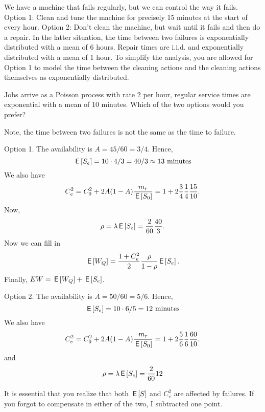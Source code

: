 \begin{exercise}[201706]
 We have a machine that fails regularly, but we can control the way it fails.
 Option 1: Clean and tune the machine for precisely 15 minutes at the start of every hour.
 Option 2: Don't clean the machine, but wait until it fails and then do a repair.
 In the latter situation, the time between two failures is exponentially distributed with a mean of 6 hours.
 Repair times are i.i.d.
 and exponentially distributed with a mean of 1 hour.
 To simplify the analysis, you are allowed for Option 1 to model the time between the cleaning actions and the cleaning actions themselves as exponentially distributed.

Jobs arrive as a Poisson process with rate $2$ per hour, regular service times are exponential with a mean of $10$ minutes. Which of the two options would you prefer?
\begin{solution}
Note, the time between two failures is not the same as the time to failure.


Option 1. The availability is $A=45/60=3/4$. Hence, 
\begin{equation*}
\,\mathsf{E}\left[S_e\right] = 10\cdot 4/3 = 40/3 \approx 13\text{ minutes}
\end{equation*}
We also have
\begin{equation*}
 C_e^2 = C_0^2 + 2A(1-A)\frac{m_r}{\,\mathsf{E}\left[S_0\right]} = 1 + 2\frac{3}{4}\frac1{4}\frac{15}{10}.
 \end{equation*}
Now,
\begin{equation*}
 \rho = \lambda \,\mathsf{E}\left[S_e\right] = \frac{2}{60}\frac{40}3.
\end{equation*}
Now we can fill in 
\begin{equation*}
 \,\mathsf{E}\left[W_Q\right] = \frac{1 + C_e^2}2 \frac{\rho}{1-\rho} \,\mathsf{E}\left[S_e\right].
\end{equation*}
Finally, $E W = \,\mathsf{E}\left[W_Q\right] + \,\mathsf{E}\left[S_e\right]$.


Option 2. The availability is $A=50/60=5/6$. Hence, 
\begin{equation*}
\,\mathsf{E}\left[S_e\right] = 10\cdot 6/5 = 12\text{ minutes}
\end{equation*}
We also have
\begin{equation*}
 C_e^2 = C_0^2 + 2A(1-A)\frac{m_r}{\,\mathsf{E}\left[S_0\right]} = 1 + 2\frac{5}{6}\frac1{6}\frac{60}{10}.
 \end{equation*}
and
\begin{equation*}
 \rho = \lambda \,\mathsf{E}\left[S_e\right] = \frac{2}{60}12
\end{equation*}

It is essential that you realize that both $\,\mathsf{E}\left[S\right]$ and $C_e^2$ are affected by failures. If you forgot to compensate in either of the two, I subtracted one point. 
\end{solution}
\end{exercise}


